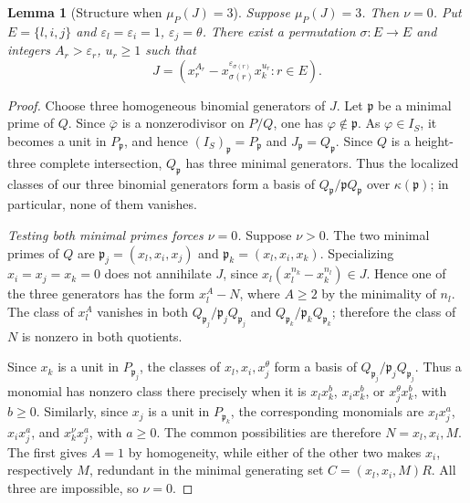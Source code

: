 \documentclass[10pt]{amsart}
\theoremstyle{plain}
\newtheorem{lemma}{Lemma}[section]
\begin{document}
\begin{lemma}[Structure when \(\mu_P(J)=3\)]
\label{lem:type3-ci-form}
Suppose \(\mu_P(J)=3\).  Then \(\nu=0\).  Put
\(E=\{l,i,j\}\) and
\(\varepsilon_l=\varepsilon_i=1\), \(\varepsilon_j=\theta\).
There exist a permutation \(\sigma:E\to E\) and integers
\(A_r>\varepsilon_r\), \(u_r\ge1\) such that
\begin{equation}\label{eq:type3-ci-form}
J=\left(
 x_r^{A_r}-x_{\sigma(r)}^{\varepsilon_{\sigma(r)}}x_k^{u_r}
 :r\in E
\right).
\end{equation}
\end{lemma}

\begin{proof}
Choose three homogeneous binomial generators of \(J\).  Let
\(\mathfrak p\) be a minimal prime of \(Q\).  Since
\(\bar\varphi\) is a nonzerodivisor on \(P/Q\), one has
\(\varphi\notin\mathfrak p\).  As \(\varphi\in I_S\), it becomes a
unit in \(P_{\mathfrak p}\), and hence
\((I_S)_{\mathfrak p}=P_{\mathfrak p}\) and
\(J_{\mathfrak p}=Q_{\mathfrak p}\).
Since \(Q\) is a height-three complete intersection,
\(Q_{\mathfrak p}\) has three minimal generators.  Thus the localized
classes of our three binomial generators form a basis of
\(Q_{\mathfrak p}/\mathfrak pQ_{\mathfrak p}\) over
\(\kappa(\mathfrak p)\); in particular, none of them vanishes.

\emph{Testing both minimal primes forces \(\nu=0\).}
Suppose \(\nu>0\).  The two minimal
primes of \(Q\) are
\(\mathfrak p_j=(x_l,x_i,x_j)\) and
\(\mathfrak p_k=(x_l,x_i,x_k)\).
Specializing \(x_i=x_j=x_k=0\) does not annihilate \(J\), since
\(x_l(x_l^{n_k}-x_k^{n_l})\in J\).  Hence one of the three generators
has the form \(x_l^A-N\), where \(A\ge2\) by the minimality of \(n_l\).
The class of \(x_l^A\) vanishes in both
\(Q_{\mathfrak p_j}/\mathfrak p_jQ_{\mathfrak p_j}\) and
\(Q_{\mathfrak p_k}/\mathfrak p_kQ_{\mathfrak p_k}\); therefore the
class of \(N\) is nonzero in both quotients.

Since \(x_k\) is a unit in \(P_{\mathfrak p_j}\), the classes of
\(x_l,x_i,x_j^\theta\) form a basis of
\(Q_{\mathfrak p_j}/\mathfrak p_jQ_{\mathfrak p_j}\).  Thus a monomial
has nonzero class there precisely when it is
\(x_lx_k^b\), \(x_ix_k^b\), or \(x_j^\theta x_k^b\), with \(b\ge0\).
Similarly, since \(x_j\) is a unit in \(P_{\mathfrak p_k}\), the
corresponding monomials are
\(x_lx_j^a\), \(x_ix_j^a\), and \(x_k^\nu x_j^a\), with \(a\ge0\).
The common possibilities are therefore \(N=x_l,x_i,M\).
The first gives \(A=1\) by homogeneity, while either of the other two
makes \(x_i\), respectively \(M\), redundant in the minimal generating
set \(C=(x_l,x_i,M)R\).  All three are impossible, so \(\nu=0\).


\end{proof}
\end{document}
